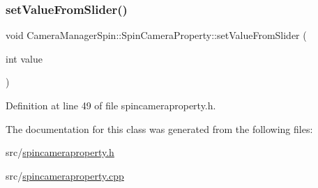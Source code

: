 \subsubsection{\texorpdfstring{setValueFromSlider()}{setValueFromSlider()}}
{\footnotesize\ttfamily void Camera\+Manager\+Spin\+::\+Spin\+Camera\+Property\+::set\+Value\+From\+Slider (\begin{DoxyParamCaption}\item[{int}]{value }\end{DoxyParamCaption})\hspace{0.3cm}{\ttfamily [inline]}}



Definition at line 49 of file spincameraproperty.\+h.



The documentation for this class was generated from the following files\+:\begin{DoxyCompactItemize}
\item 
src/\mbox{\hyperlink{spincameraproperty_8h}{spincameraproperty.\+h}}\item 
src/\mbox{\hyperlink{spincameraproperty_8cpp}{spincameraproperty.\+cpp}}\end{DoxyCompactItemize}
